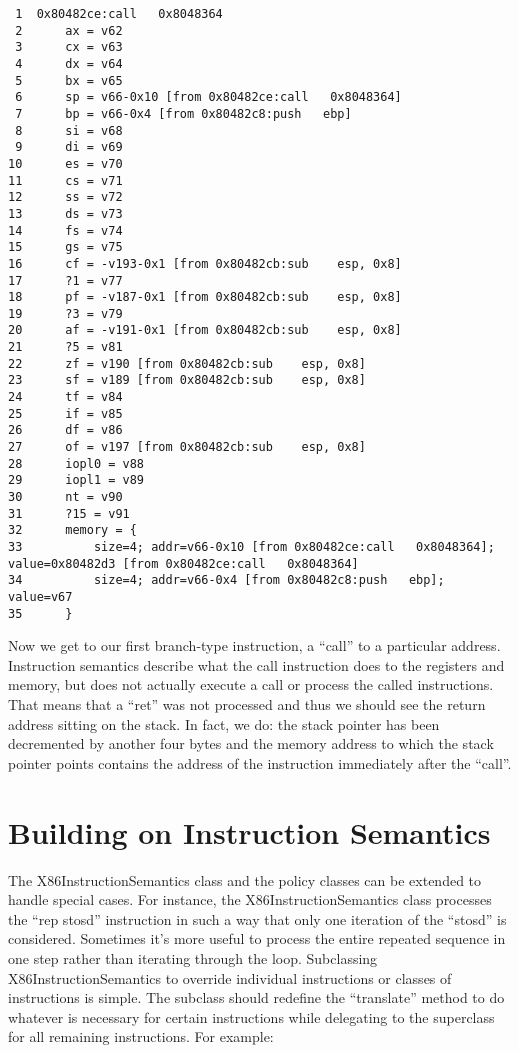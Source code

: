 \begin{verbatim}
 1  0x80482ce:call   0x8048364
 2      ax = v62
 3      cx = v63
 4      dx = v64
 5      bx = v65
 6      sp = v66-0x10 [from 0x80482ce:call   0x8048364]
 7      bp = v66-0x4 [from 0x80482c8:push   ebp]
 8      si = v68
 9      di = v69
10      es = v70
11      cs = v71
12      ss = v72
13      ds = v73
14      fs = v74
15      gs = v75
16      cf = -v193-0x1 [from 0x80482cb:sub    esp, 0x8]
17      ?1 = v77
18      pf = -v187-0x1 [from 0x80482cb:sub    esp, 0x8]
19      ?3 = v79
20      af = -v191-0x1 [from 0x80482cb:sub    esp, 0x8]
21      ?5 = v81
22      zf = v190 [from 0x80482cb:sub    esp, 0x8]
23      sf = v189 [from 0x80482cb:sub    esp, 0x8]
24      tf = v84
25      if = v85
26      df = v86
27      of = v197 [from 0x80482cb:sub    esp, 0x8]
28      iopl0 = v88
29      iopl1 = v89
30      nt = v90
31      ?15 = v91
32      memory = {
33          size=4; addr=v66-0x10 [from 0x80482ce:call   0x8048364]; value=0x80482d3 [from 0x80482ce:call   0x8048364]
34          size=4; addr=v66-0x4 [from 0x80482c8:push   ebp]; value=v67
35      }
\end{verbatim}

Now we get to our first branch-type instruction, a ``call'' to a
particular address.  Instruction semantics describe what the call
instruction does to the registers and memory, but does not actually
execute a call or process the called instructions. That means that a
``ret'' was not processed and thus we should see the return address
sitting on the stack. In fact, we do: the stack pointer has been
decremented by another four bytes and the memory address to which the
stack pointer points contains the address of the instruction
immediately after the ``call''.

\section{Building on Instruction Semantics}

The X86InstructionSemantics class and the policy classes can be
extended to handle special cases. For instance, the
X86InstructionSemantics class processes the ``rep stosd'' instruction
in such a way that only one iteration of the ``stosd'' is
considered. Sometimes it's more useful to process the entire repeated
sequence in one step rather than iterating through the
loop. Subclassing X86InstructionSemantics to override individual
instructions or classes of instructions is simple.  The subclass
should redefine the ``translate'' method to do whatever is necessary
for certain instructions while delegating to the superclass for all
remaining instructions. For example:

